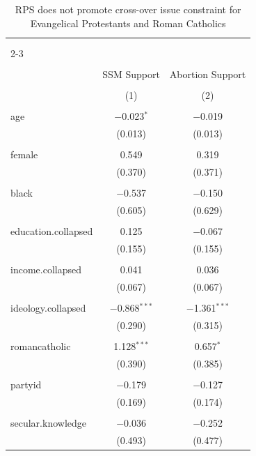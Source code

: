 \documentclass[12pt,letterpaper]{article}
\begin{document}
\begin{description}
 
\begin{table}[H] \centering 
	\caption{RPS does not promote cross-over issue constraint for Evangelical Protestants and Roman Catholics} 
	\label{} 
	\scriptsize 
	\begin{tabular}{@{\extracolsep{5pt}}lcc} 
		\\[-1.8ex]\hline 
		\hline \\[-1.8ex] 
		& \multicolumn{2}{c}{\textit{}} \\ 
		\cline{2-3} 
		\\[-1.8ex] \\ 
		& SSM Support & Abortion Support \\ 
		\\[-1.8ex] & (1) & (2)\\ 
		\hline \\[-1.8ex] 
		age & $-$0.023$^{*}$ & $-$0.019 \\ 
		& (0.013) & (0.013) \\ 
		& & \\ 
		female & 0.549 & 0.319 \\ 
		& (0.370) & (0.371) \\ 
		& & \\ 
		black & $-$0.537 & $-$0.150 \\ 
		& (0.605) & (0.629) \\ 
		& & \\ 
		education.collapsed & 0.125 & $-$0.067 \\ 
		& (0.155) & (0.155) \\ 
		& & \\ 
		income.collapsed & 0.041 & 0.036 \\ 
		& (0.067) & (0.067) \\ 
		& & \\ 
		ideology.collapsed & $-$0.868$^{***}$ & $-$1.361$^{***}$ \\ 
		& (0.290) & (0.315) \\ 
		& & \\ 
		romancatholic & 1.128$^{***}$ & 0.657$^{*}$ \\ 
		& (0.390) & (0.385) \\ 
		& & \\ 
		partyid & $-$0.179 & $-$0.127 \\ 
		& (0.169) & (0.174) \\ 
		& & \\ 
		secular.knowledge & $-$0.036 & $-$0.252 \\ 
		& (0.493) & (0.477) \\ 

\end{tabular}
\end{table}
\end{description}
\end{document}
